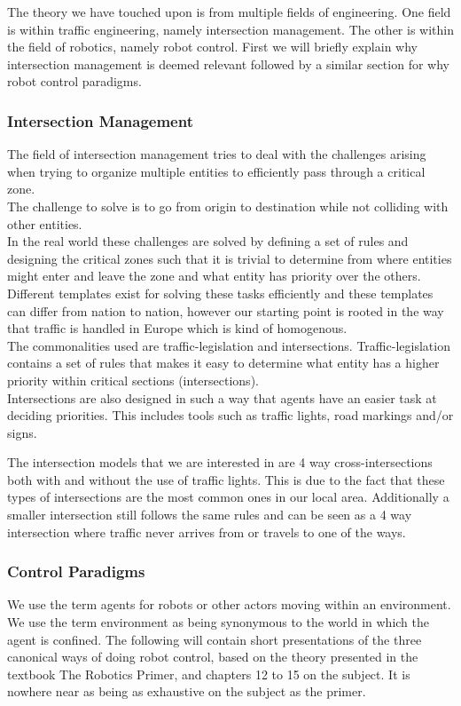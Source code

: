 The theory we have touched upon is from multiple fields of engineering. One field is within traffic engineering, namely intersection management. The other is within the field of robotics, namely robot control.
First we will briefly explain why intersection management is deemed relevant followed by a similar section for why robot control paradigms.

\subsubsection{Intersection Management}
The field of intersection management tries to deal with the challenges arising when trying to organize multiple entities to efficiently pass through a critical zone.\\
The challenge to solve is to go from origin to destination while not colliding with other entities.\\

In the real world these challenges are solved by defining a set of rules and designing the critical zones such that it is trivial to determine from where entities might enter and leave the zone and what entity has priority over the others.\\

Different templates exist for solving these tasks efficiently and these templates can differ from nation to nation, however our starting point is rooted in the way that traffic is handled in Europe which is kind of homogenous.\\

The commonalities used are traffic-legislation and intersections.
Traffic-legislation contains a set of rules that makes it easy to determine what entity has a higher priority within critical sections (intersections).\\
Intersections are also designed in such a way that agents have an easier task at deciding priorities. 
This includes tools such as traffic lights, road markings and/or signs.

The intersection models that we are interested in are 4 way cross-intersections both with and without the use of traffic lights.
This is due to the fact that these types of intersections are the most common ones in our local area. Additionally a smaller intersection still follows the same rules and can be seen as a 4 way intersection where traffic never arrives from or travels to one of the ways.

\subsubsection{Control Paradigms}
We use the term agents for robots or other actors moving within an environment.\\
We use the term environment as being synonymous to the world in which the agent is confined.
The following will contain short presentations of the three canonical ways of doing robot control, based on the theory presented in the textbook The Robotics Primer\citep{book:mataric}, and chapters 12 to 15 on the subject.
It is nowhere near as being as exhaustive on the subject as the primer.\\

